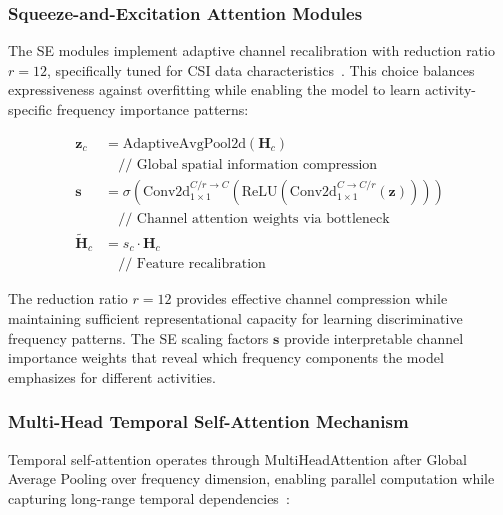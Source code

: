 \documentclass[lettersize,journal]{IEEEtran}
\begin{document}
\subsubsection{Squeeze-and-Excitation Attention Modules}

The SE modules implement adaptive channel recalibration with reduction ratio $r=12$, specifically tuned for CSI data characteristics~\cite{se_networks2018}. This choice balances expressiveness against overfitting while enabling the model to learn activity-specific frequency importance patterns:

\begin{tcolorbox}[colback=blue!5!white,colframe=blue!50!black,title=\textbf{Squeeze-and-Excitation Mechanism}]
\begin{align}
\mathbf{z}_c &= \text{AdaptiveAvgPool2d}(\mathbf{H}_c) \nonumber\\
&\quad \text{// Global spatial information compression} \nonumber\\[0.5em]
\mathbf{s} &= \sigma(\text{Conv2d}_{1\times1}^{C/r\rightarrow C}(\text{ReLU}(\text{Conv2d}_{1\times1}^{C\rightarrow C/r}(\mathbf{z})))) \nonumber\\
&\quad \text{// Channel attention weights via bottleneck} \nonumber\\[0.5em]
\tilde{\mathbf{H}}_c &= s_c \cdot \mathbf{H}_c \\
&\quad \text{// Feature recalibration} \nonumber
\end{align}
\end{tcolorbox}

The reduction ratio $r=12$ provides effective channel compression while maintaining sufficient representational capacity for learning discriminative frequency patterns. The SE scaling factors $\mathbf{s}$ provide interpretable channel importance weights that reveal which frequency components the model emphasizes for different activities.

\subsubsection{Multi-Head Temporal Self-Attention Mechanism}

Temporal self-attention operates through MultiHeadAttention after Global Average Pooling over frequency dimension, enabling parallel computation while capturing long-range temporal dependencies~\cite{vaswani2017attention}:
\end{document}
